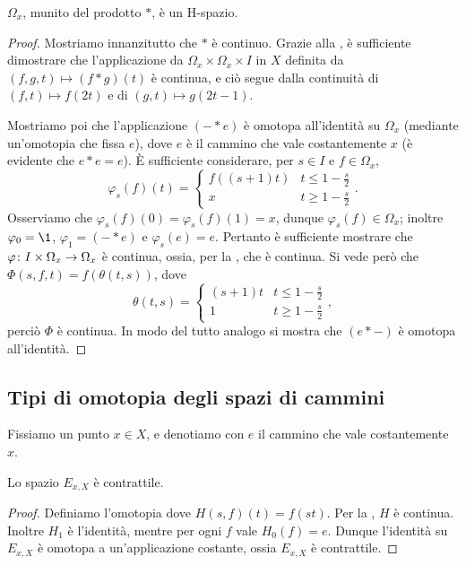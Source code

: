 \begin{proposition}
$\Omega_x$, munito del prodotto $\ast$, è un H-spazio.
\end{proposition}
\begin{proof}
Mostriamo innanzitutto che $\ast$ è continuo. Grazie alla , è sufficiente dimostrare che l'applicazione da $\Omega_x\times\Omega_x\times I$ in $X$ definita da $(f,g,t)\mapsto (f\ast g)(t)$ è continua, e ciò segue dalla continuità di $(f,t)\mapsto f(2t)$ e di $(g,t)\mapsto g(2t-1)$.

Mostriamo poi che l'applicazione $(-\ast e)$
è omotopa all'identità su $\Omega_x$ (mediante un'omotopia che fissa $e$), dove $e$ è il cammino che vale costantemente $x$ (è evidente che $e\ast e=e$). È sufficiente considerare, per $s\in I$ e $f\in\Omega_x$, 
$$
\varphi_s(f)(t)=
\begin{cases}
f((s+1)t)&t\le 1-\frac{s}{2}\\
x&t\ge 1-\frac{s}{2}
\end{cases}.
$$
Osserviamo che $\varphi_s(f)(0)=\varphi_s(f)(1)=x$, dunque $\varphi_s(f)\in\Omega_x$; inoltre $\varphi_0=\1$, $\varphi_1=(-\ast e)$ e $\varphi_s(e)=e$. Pertanto è sufficiente mostrare che $\varphi\colon I\times\Omega_x\to\Omega_x$ è continua, ossia, per la , che
è continua. Si vede però che $\Phi(s,f, t)=f(\theta(t,s))$, dove
$$
\theta(t,s)=
\begin{cases}
(s+1)t&t\le 1-\frac{s}{2}\\
1&t\ge 1-\frac{s}{2}
\end{cases},
$$
perciò $\Phi$ è continua. In modo del tutto analogo si mostra che $(e\ast-)$ è omotopa all'identità.
\end{proof}

\subsection{Tipi di omotopia degli spazi di cammini}

Fissiamo un punto $x\in X$, e denotiamo con $e$ il cammino che vale costantemente $x$.

\begin{proposition}
Lo spazio $E_{x,X}$ è contrattile.
\end{proposition}
\begin{proof}
Definiamo l'omotopia
dove $H(s,f)(t)=f(st)$. Per la , $H$ è continua. Inoltre $H_1$ è l'identità, mentre per ogni $f$ vale $H_0(f)=e$. Dunque l'identità su $E_{x,X}$ è omotopa a un'applicazione costante, ossia $E_{x,X}$ è contrattile.
\end{proof}

